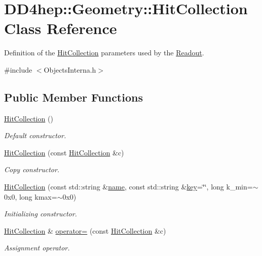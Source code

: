 \hypertarget{class_d_d4hep_1_1_geometry_1_1_hit_collection}{}\section{D\+D4hep\+:\+:Geometry\+:\+:Hit\+Collection Class Reference}
\label{class_d_d4hep_1_1_geometry_1_1_hit_collection}


Definition of the \hyperlink{class_d_d4hep_1_1_geometry_1_1_hit_collection}{Hit\+Collection} parameters used by the \hyperlink{class_d_d4hep_1_1_geometry_1_1_readout}{Readout}.  




{\ttfamily \#include $<$Objects\+Interna.\+h$>$}

\subsection*{Public Member Functions}
\begin{DoxyCompactItemize}
\item 
\hyperlink{class_d_d4hep_1_1_geometry_1_1_hit_collection_aede87fea1d9371d8d8459645dea6a663}{Hit\+Collection} ()
\begin{DoxyCompactList}\small\item\em Default constructor. \end{DoxyCompactList}\item 
\hyperlink{class_d_d4hep_1_1_geometry_1_1_hit_collection_a4caf6de6f5c18ee344c1d380fecd66ba}{Hit\+Collection} (const \hyperlink{class_d_d4hep_1_1_geometry_1_1_hit_collection}{Hit\+Collection} \&c)
\begin{DoxyCompactList}\small\item\em Copy constructor. \end{DoxyCompactList}\item 
\hyperlink{class_d_d4hep_1_1_geometry_1_1_hit_collection_abe40772ecb87c4777d652672209571d8}{Hit\+Collection} (const std\+::string \&\hyperlink{class_d_d4hep_1_1_geometry_1_1_hit_collection_a9c9a772a612f38f6104fd976f8b20ba0}{name}, const std\+::string \&\hyperlink{class_d_d4hep_1_1_geometry_1_1_hit_collection_a4948f37ecd677f966101a2d662412790}{key}=\char`\"{}\char`\"{}, long k\+\_\+min=$\sim$0x0, long kmax=$\sim$0x0)
\begin{DoxyCompactList}\small\item\em Initializing constructor. \end{DoxyCompactList}\item 
\hyperlink{class_d_d4hep_1_1_geometry_1_1_hit_collection}{Hit\+Collection} \& \hyperlink{class_d_d4hep_1_1_geometry_1_1_hit_collection_aaa94ed4af290c075c5e6c8fd553bb84c}{operator=} (const \hyperlink{class_d_d4hep_1_1_geometry_1_1_hit_collection}{Hit\+Collection} \&c)
\begin{DoxyCompactList}\small\item\em Assignment operator. \end{DoxyCompactList}\end{DoxyCompactItemize}
